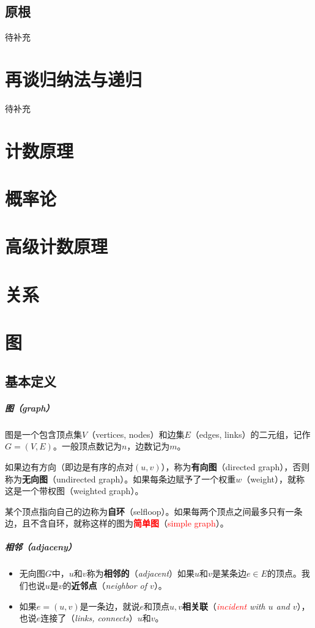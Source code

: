 \documentclass[b5paper,oneside]{ctexbook}
\newcommand{\Red}[1]{\textcolor[named]{red}{#1}}
\begin{document}
\section{原根}

待补充
\chapter{再谈归纳法与递归}
待补充
\chapter{计数原理}
\chapter{概率论}
\chapter{高级计数原理}
\chapter{关系}

\chapter{图}
\section{基本定义}
\paragraph{图（graph）}图是一个包含顶点集$V$（vertices, nodes）和边集$E$（edges, links）的二元组，记作$G=(V,E)$。一般顶点数记为$n$，边数记为$m$。

如果边有方向（即边是有序的点对$(u,v)$），称为\textbf{有向图}（directed graph），否则称为\textbf{无向图}（undirected graph）。如果每条边赋予了一个权重$w$（weight），就称这是一个带权图（weighted graph）。

某个顶点指向自己的边称为\textbf{自环}（selfloop）。如果每两个顶点之间最多只有一条边，且不含自环，就称这样的图为\Red{\textbf{简单图}}（\Red{simple graph}）。
\paragraph{相邻（adjaceny）}
\begin{itemize}
\item 无向图$G$中，$u$和$v$称为\textbf{相邻的}（{\it adjacent}）如果$u$和$v$是某条边$e\in E$的顶点。我们也说$u$是$v$的\textbf{近邻点}（{\it neighbor of $v$}）。
\item 如果$e=(u,v)$是一条边，就说$e$和顶点$u,v$\textbf{相关联}（\textit{\Red{incident} with $u$ and $v$}），也说$e$连接了（\textit{links, connects}）$u$和$v$。
\end{itemize}
\end{document}
